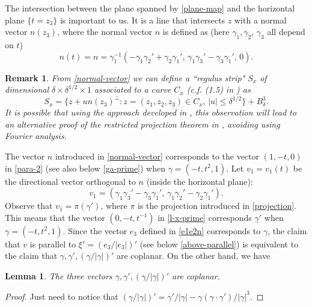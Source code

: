 \documentclass{amsart}%
\numberwithin{equation}{section}
\newtheorem{lemma}[theorem]{Lemma}
\newtheorem{remark}[theorem]{Remark}
\newcommand{\ga}{\gamma}
\newcommand{\de}{\delta}
\newcommand{\1}{\mathbbm{1}}
\begin{document}
The intersection between the plane spanned by \eqref{plane-map} and the horizontal plane $\{t=z_3\}$ is important to us. 
It is a line that intersects $z$ with a normal vector $n(z_3)$, where the normal vector $n$ is defined as (here $\ga_1,\ga_2$, $\ga_3$ all depend on $t$)
\begin{equation}
\label{normal-vector}
    n(t)=n=\ga_1^{-1}(-\ga_1\ga_2'+\ga_2\ga_1',\,\ga_1\ga_3'-\ga_3\ga_1',\, 0).
\end{equation}

\begin{remark}
\rm

From \eqref{normal-vector} we can define a ``regulus strip" $S_x$ of dimensional $\de\times\de^{1/2}\times1$ associated to a curve $C_x$ (c.f. (1.5) in \cite{KWZ}) as
\begin{equation}
    S_x=\{z+un(z_3)^\perp:z=(z_1,z_2,z_3)\in C_x,\, |u|\leq\de^{1/2}\}+B^3_\de.
\end{equation}
It is possible that using the approach developed in \cite{KWZ}, this observation will lead to an alternative proof of the restricted projection theorem in \cite{GGGHMW},
avoiding using Fourier analysis.

\end{remark}


The vector $n$ introduced in \eqref{normal-vector} corresponds to the vector $(1,-t,0)$ in \eqref{para-2} (see also below \eqref{ga-prime}) when $\ga=(-t,t^2,1)$. 
Let $v_1=v_1(t)$ be the directional vector orthogonal to $n$ (inside the horizontal plane):
\begin{equation}
    v_1=(\ga_1\ga_3'-\ga_3\ga_1',\,\ga_1\ga_2'-\ga_2\ga_1'). 
\end{equation}
Observe that $v_1=\pi(\ga')$, where $\pi$ is the projection introduced in \eqref{projection}. 
This means that the vector $(0,-t,t^{-1})$ in \eqref{l-x-prime} corresponds $\ga'$ when $\ga=(-t,t^2,1)$. 
Since the vector $e_3$ defined in \eqref{e1e2n} corresponds to $\ga$, the claim that $v$ is parallel to $\xi'=(e_3/|e_3|)'$ (see below \eqref{above-parallel}) is equivalent to the claim that $\ga, \ga', (\ga/|\ga|)'$ are coplanar.
On the other hand, we have
\begin{lemma}
The three vectors $\ga, \ga', (\ga/|\ga|)'$ are coplanar. 
\end{lemma}
\begin{proof}
Just need to notice that $(\ga/|\ga|)'=\ga'/|\ga|-\ga(\ga\cdot\ga')/|\ga|^3$.
\end{proof}


\bigskip





\end{document}
